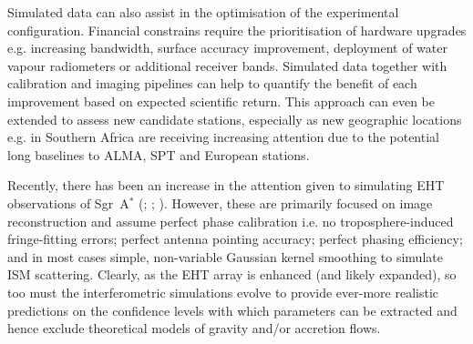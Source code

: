 Simulated data can also assist in the optimisation of the experimental configuration. Financial constrains require the prioritisation of hardware upgrades e.g. increasing bandwidth, surface accuracy improvement, deployment of water vapour radiometers or additional receiver bands. Simulated data together with calibration and imaging pipelines can help to quantify the benefit of each improvement based on expected scientific return. This approach can even be extended to assess new candidate stations, especially as new geographic locations e.g. in Southern Africa are receiving increasing attention due to the potential long baselines to ALMA, SPT and European stations.

Recently, there has been an increase in the attention given to simulating EHT observations of Sgr~A$^*$ (\citealt{Fish_2014}; \citealt{Lu_2014}; \citealt{2015arXiv151201413B}). However, these are primarily focused on image reconstruction and assume perfect phase calibration i.e. no troposphere-induced fringe-fitting errors; perfect antenna pointing accuracy; perfect phasing efficiency; and in most cases simple, non-variable Gaussian kernel smoothing to simulate ISM scattering. Clearly, as the EHT array is enhanced (and likely expanded), so too must the interferometric simulations evolve to provide ever-more realistic predictions on the confidence levels with which parameters can be extracted and hence exclude theoretical models of gravity and/or accretion flows.


